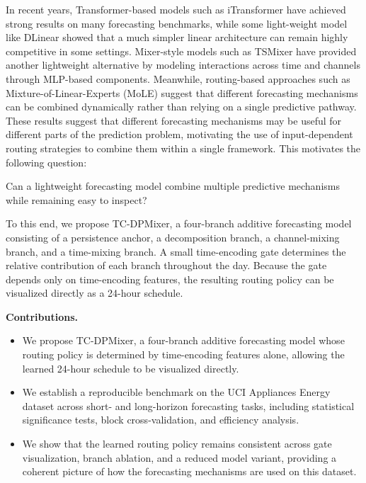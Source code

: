 \documentclass{article}
\begin{document}
In recent years, Transformer-based models such as iTransformer \citep{itransformer} have achieved strong results on many forecasting benchmarks, while some light-weight model like DLinear \citep{dlinear} showed that a much simpler linear architecture can remain highly competitive in some settings. Mixer-style models such as TSMixer \citep{tsmixer} have provided another lightweight alternative by modeling interactions across time and channels through MLP-based components. Meanwhile, routing-based approaches such as Mixture-of-Linear-Experts (MoLE) \citep{mole} suggest that different forecasting mechanisms can be combined dynamically rather than relying on a single predictive pathway. These results suggest that different forecasting mechanisms may be useful for different parts of the prediction problem, motivating the use of input-dependent routing strategies to combine them within a single framework. This motivates the following question:

Can a lightweight forecasting model combine multiple predictive mechanisms while remaining easy to inspect?

To this end, we propose TC-DPMixer, a four-branch additive forecasting model consisting of a persistence anchor, a decomposition branch, a channel-mixing branch, and a time-mixing branch. A small time-encoding gate determines the relative contribution of each branch throughout the day. Because the gate depends only on time-encoding features, the resulting routing policy can be visualized directly as a 24-hour schedule.


\textbf{Contributions.}
\begin{itemize}
\item We propose TC-DPMixer, a four-branch additive forecasting model whose routing policy is determined by time-encoding features alone, allowing the learned 24-hour schedule to be visualized directly.

\item We establish a reproducible benchmark on the UCI Appliances Energy dataset across short- and long-horizon forecasting tasks, including statistical significance tests, block cross-validation, and efficiency analysis.

\item We show that the learned routing policy remains consistent across gate visualization, branch ablation, and a reduced model variant, providing a coherent picture of how the forecasting mechanisms are used on this dataset.
\end{itemize}
\end{document}
